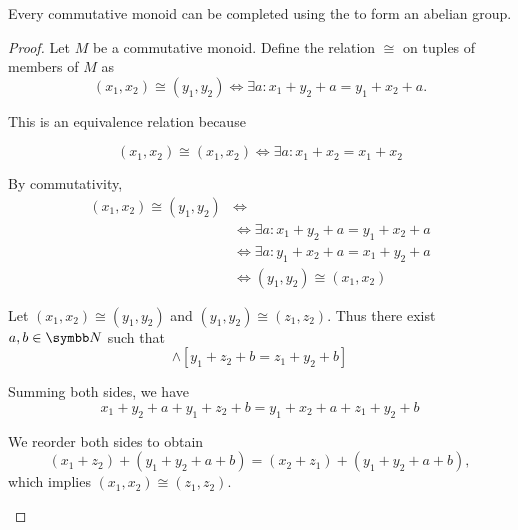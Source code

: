 \begin{proposition}\label{thm:monoid_completion_to_abelian_group}\cite{nLab:grothendieck_group_of_a_commutative_monoid}
  Every commutative monoid can be completed using the  to form an abelian group.
\end{proposition}
\begin{proof}
  Let \( M \) be a commutative monoid. Define the relation \( \cong \) on tuples of members of \( M \) as
  \begin{equation*}
    (x_1, x_2) \cong (y_1, y_2) \iff \exists a: x_1 + y_2 + a = y_1 + x_2 + a.
  \end{equation*}

  This is an equivalence relation because
  \begin{description}
    \begin{equation*}
      (x_1, x_2) \cong (x_1, x_2) \iff \exists a: x_1 + x_2 = x_1 + x_2
    \end{equation*}

     By commutativity,
    \begin{align*}
      (x_1, x_2) \cong (y_1, y_2)
      &\iff \\ &\iff
      \exists a: x_1 + y_2 + a = y_1 + x_2 + a
      \\ &\iff
      \exists a: y_1 + x_2 + a = x_1 + y_2 + a
      \\ &\iff
      (y_1, y_2) \cong (x_1, x_2)
    \end{align*}

     Let \( (x_1, x_2) \cong (y_1, y_2) \) and \( (y_1, y_2) \cong (z_1, z_2) \). Thus there exist \( a, b \in \BB{N} \) such that
    \begin{equation*}
      [x_1 + y_2 + a = y_1 + x_2 + a] \land [y_1 + z_2 + b = z_1 + y_2 + b]
    \end{equation*}

    Summing both sides, we have
    \begin{equation*}
      x_1 + y_2 + a + y_1 + z_2 + b = y_1 + x_2 + a + z_1 + y_2 + b
    \end{equation*}

    We reorder both sides to obtain
    \begin{equation*}
      (x_1 + z_2) + (y_1 + y_2 + a + b) = (x_2 + z_1) + (y_1 + y_2 + a + b),
    \end{equation*}
    which implies \( (x_1, x_2) \cong (z_1, z_2) \).
  \end{description}


\end{proof}
